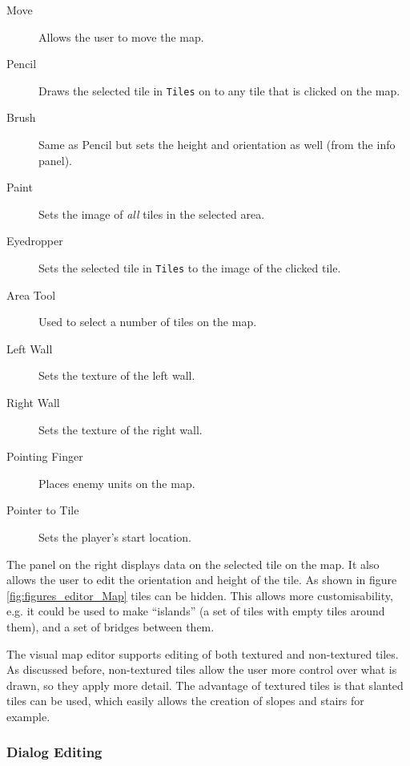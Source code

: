 \begin{description}
	\item[Move]   Allows the user to move the map.
	\item[Pencil] Draws the selected tile in \texttt{Tiles} on to any tile that is clicked on the map.
	\item[Brush]  Same as Pencil but sets the height and orientation as well (from the info panel).
	\item[Paint]  Sets the image of \emph{all} tiles in the selected area.
	\item[Eyedropper]  Sets the selected tile in \texttt{Tiles} to the image of the clicked tile.
	\item[Area Tool]  Used to select a number of tiles on the map.
	\item[Left Wall]  Sets the texture of the left wall.
	\item[Right Wall] Sets the texture of the right wall.
	\item[Pointing Finger]  Places enemy units on the map.
	\item[Pointer to Tile]  Sets the player's start location.
\end{description}

The panel on the right displays data on the selected tile on the map. It also allows the user to edit the orientation and height of the tile.  As shown in figure \ref{fig:figures_editor_Map}  tiles can be hidden. This allows more customisability, e.g. it could be used to make ``islands''  (a set of tiles with empty tiles around them),  and a set of bridges between them. 

The visual map editor supports editing  of both textured and non-textured tiles. As discussed before, non-textured tiles allow the user more control over what is drawn, so they  apply more detail. The advantage of textured tiles is that slanted tiles can be used, which easily allows the creation of slopes and stairs for example.


\clearpage
\subsubsection{Dialog Editing}
\label{ssub:dialog_editing}

